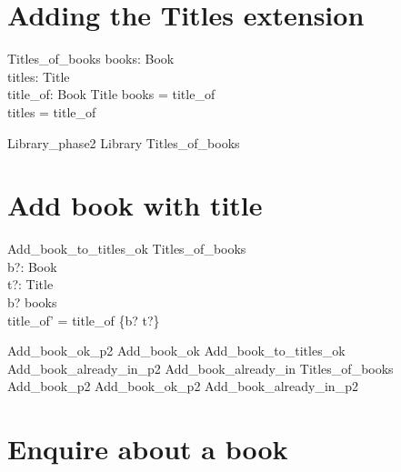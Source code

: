 \documentclass[11pt, fuzz]{article}
\begin{document}
\section{Adding the Titles extension}

\begin{zed}
    [Title]
\end{zed}

\begin{schema}{Titles\_of\_books}
    books: \power Book          \\
    titles: \power Title        \\
    title\_of: Book \pfun Title 
\where
    books = \dom title\_of \\
    titles = \ran title\_of \\
\end{schema}

\begin{zed}
    Library\_phase2  Library \land Titles\_of\_books
\end{zed}


\section{Add book with title}

\begin{schema}{Add\_book\_to\_titles\_ok}
    \Delta Titles\_of\_books \\
    b?: Book                 \\
    t?: Title                \\
\where
    b? \notin books                             \\
    title\_of' = title\_of \cup \{b? \mapsto t?\} \\
\end{schema}

\begin{zed}
    Add\_book\_ok\_p2  Add\_book\_ok \land Add\_book\_to\_titles\_ok
\also
    Add\_book\_already\_in\_p2  Add\_book\_already\_in \land \Xi Titles\_of\_books
\also
    Add\_book\_p2  Add\_book\_ok\_p2 \lor Add\_book\_already\_in\_p2 
\end{zed}


\section{Enquire about a book}
\end{document}
